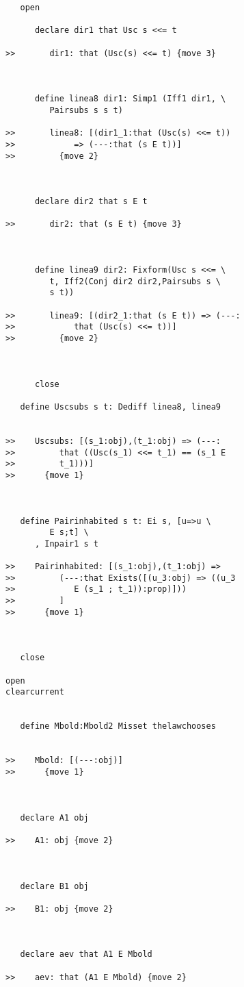 \documentclass[12pt]{article}
\begin{document}
\begin{verbatim}
   open

      declare dir1 that Usc s <<= t

>>       dir1: that (Usc(s) <<= t) {move 3}



      define linea8 dir1: Simp1 (Iff1 dir1, \
         Pairsubs s s t)

>>       linea8: [(dir1_1:that (Usc(s) <<= t))
>>            => (---:that (s E t))]
>>         {move 2}



      declare dir2 that s E t

>>       dir2: that (s E t) {move 3}



      define linea9 dir2: Fixform(Usc s <<= \
         t, Iff2(Conj dir2 dir2,Pairsubs s \
         s t))

>>       linea9: [(dir2_1:that (s E t)) => (---:
>>            that (Usc(s) <<= t))]
>>         {move 2}



      close

   define Uscsubs s t: Dediff linea8, linea9


>>    Uscsubs: [(s_1:obj),(t_1:obj) => (---:
>>         that ((Usc(s_1) <<= t_1) == (s_1 E
>>         t_1)))]
>>      {move 1}



   define Pairinhabited s t: Ei s, [u=>u \
         E s;t] \
      , Inpair1 s t

>>    Pairinhabited: [(s_1:obj),(t_1:obj) =>
>>         (---:that Exists([(u_3:obj) => ((u_3
>>            E (s_1 ; t_1)):prop)]))
>>         ]
>>      {move 1}



   close

open
clearcurrent


   define Mbold:Mbold2 Misset thelawchooses


>>    Mbold: [(---:obj)]
>>      {move 1}



   declare A1 obj

>>    A1: obj {move 2}



   declare B1 obj

>>    B1: obj {move 2}



   declare aev that A1 E Mbold

>>    aev: that (A1 E Mbold) {move 2}




\end{verbatim}
\end{document}
